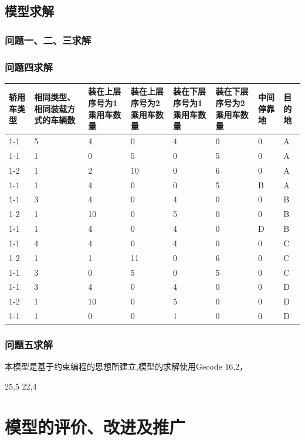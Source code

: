 \documentclass[UTF8]{ctexart}
\begin{document}
\subsection{模型求解}
\subsubsection{问题一、二、三求解}

\subsubsection{问题四求解}
\begin{table}[h!]
\centering
\begin{tabular}{|p{1.5cm}|p{1.5cm}|p{1.5cm}|p{1.5cm}|p{1.5cm}|p{1.5cm}|p{1.5cm}|p{1.5cm}|}
\hline
轿用车类型&相同类型、相同装载方式的车辆数&装在上层序号为1乘用车数量&装在上层序号为2乘用车数量&装在下层序号为1乘用车数量&装在下层序号为2乘用车数量&中间停靠地&目的地\\\hline
1-1&	5&	4&	0&	4&	0&	0&	A\\\hline
1-1&1&0&5&0&5&0&A\\\hline
1-2&1&2&10&0&6&0&A\\\hline
1-1&1&4&0&0&5&B&A\\\hline
1-1&3&4&0&4&0&0&B\\\hline
1-2&1&10&0&5&0&0&B\\\hline
1-1&1&4&0&4&0&D&B\\\hline
1-1&4&4&0&4&0&0&C\\\hline
1-2&1&1&11&0&6&0&C\\\hline
1-1&3&0&5&0&5&0&C\\\hline
1-1&3&4&0&4&0&0&D\\\hline
1-2&1&10&0&5&0&0&D\\\hline
1-1&1&0&0&1&0&0&D\\\hline	
\end{tabular}
\end{table}


\subsubsection{问题五求解}
本模型是基于约束编程的思想所建立,模型的求解使用Gecode \cite{gecode}
16,2，

25,5
22,4
\section{模型的评价、改进及推广}
\end{document}
